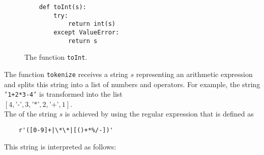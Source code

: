 \begin{figure}[!ht]
\centering
\begin{verbatim}
    def toInt(s):
        try:
            return int(s)   
        except ValueError:
            return s                
\end{verbatim}
\vspace*{-0.3cm}
\caption{The function \texttt{toInt}.}
\label{fig:toInt.py}
\end{figure}

The function \texttt{tokenize} receives a string $s$ representing an arithmetic expression and splits this
string into a list of numbers and operators. For example, the string \texttt{'1+2*3-4'} is transformed into the list
\\[0.2cm]
\hspace*{1.3cm}
$[4, \texttt{'-'}, 3, \texttt{'*'}, 2, \texttt{'+'}, 1]$.
\\[0.2cm]
The  of the string $s$ is achieved by using the regular expression that is defined as
\begin{verbatim}
    r'([0-9]+|\*\*|[()+*%/-])'
\end{verbatim}
This string is interpreted as follows:
